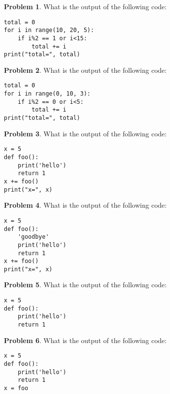 \documentclass[10pt]{article}
\theoremstyle{definition}
\newtheorem{problem}{Problem}
\begin{document}
\begin{problem}
    What is the output of the following code:
\end{problem}
\begin{lstlisting}
total = 0
for i in range(10, 20, 5):
    if i%2 == 1 or i<15:
        total += i
print("total=", total)
\end{lstlisting}
\vspace{2in}



\begin{problem}
    What is the output of the following code:
\end{problem}
\begin{lstlisting}
total = 0
for i in range(0, 10, 3):
    if i%2 == 0 or i<5:
        total += i
print("total=", total)
\end{lstlisting}
\vspace{2in}


\begin{problem}
    What is the output of the following code:
\end{problem}
\begin{lstlisting}
x = 5
def foo():
    print('hello')
    return 1
x += foo()
print("x=", x)
\end{lstlisting}
\vspace{2in}


\begin{problem}
    What is the output of the following code:
\end{problem}
\begin{lstlisting}
x = 5
def foo():
    'goodbye'
    print('hello')
    return 1
x += foo()
print("x=", x)
\end{lstlisting}
\vspace{2in}


\begin{problem}
    What is the output of the following code:
\end{problem}
\begin{lstlisting}
x = 5
def foo():
    print('hello')
    return 1
\end{lstlisting}
\vspace{2in}


\begin{problem}
    What is the output of the following code:
\end{problem}
\begin{lstlisting}
x = 5
def foo():
    print('hello')
    return 1
x = foo
\end{lstlisting}
\vspace{2in}
\end{document}
